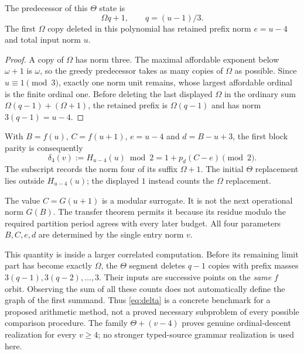 \begin{lemma}\label{lem:entry}
The predecessor of this $\Theta$ state is
\[
 \Omega q+1,\qquad q=(u-1)/3.
\]
The first $\Omega$ copy deleted in this polynomial has retained
prefix norm $e=u-4$ and total input norm $u$.
\end{lemma}
\begin{proof}
A copy of $\Omega$ has norm three. The maximal affordable exponent
below $\omega+1$ is $\omega$, so the greedy predecessor takes as
many copies of $\Omega$ as possible. Since $u\equiv1\pmod3$,
exactly one norm unit remains, whose largest affordable ordinal
is the finite ordinal one. Before deleting the last displayed $\Omega$ in the
ordinary sum $\Omega(q-1)+(\Omega+1)$, the retained prefix is
$\Omega(q-1)$ and has norm $3(q-1)=u-4$.
\end{proof}

With $B=f(u)$, $C=f(u+1)$, $e=u-4$ and $d=B-u+3$, the
first block parity is consequently
\begin{equation}\label{eq:delta}
 \delta_4(v):=H_{u-4}(u)\bmod2
       =1+p_d(C-e)\pmod2.
\end{equation}
The subscript records the norm four of its suffix $\Omega+1$.
The initial $\Theta$ replacement lies outside $H_{u-4}(u)$;
the displayed $1$ instead counts the $\Omega$ replacement.

The value $C=G(u+1)$ is a modular surrogate. It is not the next
operational norm $G(B)$. The transfer theorem permits it because
its residue modulo the required partition period agrees with every
later budget. All four parameters $B,C,e,d$ are determined by the
single entry norm $v$.

This quantity is inside a larger correlated computation. Before its
remaining limit part has become exactly $\Omega$, the $\Theta$ segment
deletes $q-1$ copies with prefix masses $3(q-1),3(q-2),\ldots,3$. Their inputs
are successive points on the \emph{same} $f$ orbit. Observing the
sum of all these counts does not automatically define the graph of
the first summand. Thus \eqref{eq:delta} is a concrete benchmark for
a proposed arithmetic method, not a proved necessary subproblem of
every possible comparison procedure. The family
$\Theta+(v-4)$ proves genuine ordinal-descent realization for every
$v\ge4$; no stronger typed-source grammar realization is used here.


